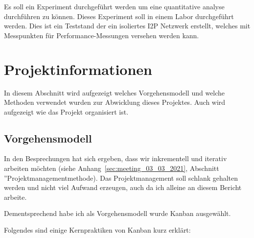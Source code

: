 Es soll ein Experiment durchgeführt werden um eine quantitative analyse durchführen zu können.
Dieses Experiment soll in einem Labor durchgeführt werden.
Dies ist ein Teststand der ein isoliertes I2P Netzwerk erstellt, welches mit Messpunkten für Performance-Messungen versehen werden kann.



\section{Projektinformationen}

In diesem Abschnitt wird aufgezeigt welches Vorgehensmodell und welche Methoden verwendet wurden zur Abwicklung dieses Projektes.
Auch wird aufgezeigt wie das Projekt organisiert ist.

\subsection{Vorgehensmodell}

 In den Besprechungen hat sich ergeben, dass wir inkrementell und iterativ arbeiten möchten
(siehe Anhang~\ref{sec:meeting_03_03_2021}, Abschnitt ''Projektmanagementmethode).
Das Projektmanagement soll schlank gehalten werden und nicht viel Aufwand erzeugen, auch da ich alleine an diesem Bericht arbeite.

Dementsprechend habe ich als Vorgehensmodell wurde Kanban ausgewählt.

Folgendes sind einige Kernpraktiken von Kanban kurz erklärt:

